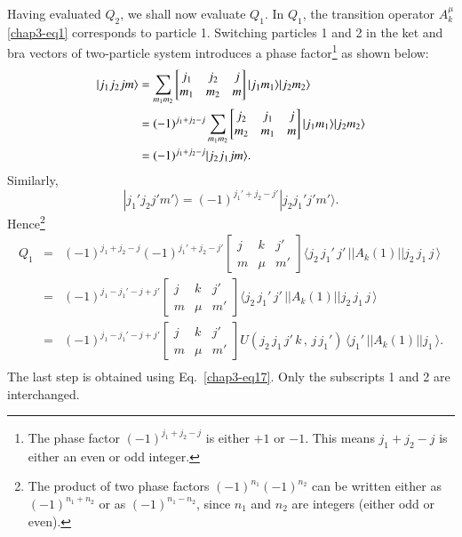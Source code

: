 Having evaluated $Q_2$, we shall now evaluate $Q_1$. In $Q_1$, the transition operator $A_k^\mu$ \eqref{chap3-eq1} corresponds to particle 1. Switching particles 1 and 2 in the ket and bra vectors of two-particle system introduces a phase factor\footnote{The phase factor $(-1)^{j_1 +j_2-j}$ is either $+1$ or $-1$. This means $j_1 + j_2-j$ is either an even or odd integer.}  as shown below:
\begin{align}
| j_1 j_2 j m\rangle 
& = \sum_{m_1m_2} \begin{bmatrix}j_1 & j_2 & j\\m_1 & m_2 & m\end{bmatrix} |j_1 m_1 \rangle| j_2 m_2\rangle \notag \\
& = (-1)^{j_1+j_2-j} \sum_{m_1 m_2} 
	\begin{bmatrix}j_2 & j_1 & j\\m_2 & m_1 & m \end{bmatrix} |j_1 m_1 \rangle | j_2 m_2 \rangle \notag \\
& = (-1)^{j_1 + j_2-j} | j_2 j_1 j m \rangle .\label{chap3-eq19}
\end{align}
Similarly,
\begin{equation}
|j_1' j_2 j' m' \rangle = (-1)^{j_1' + j_2 - j'} | j_2 j_1' j' m' \rangle . \label{chap3-eq20}
\end{equation}
Hence\footnote{The product of two phase factors $(-1)^{n_1} (-1)^{n_2}$ can be written either as $(-1)^{n_1 + n_2}$ or as $(-1)^{n_1-n_2}$, since $n_1$ and $n_2$ are integers (either odd or even).}
\begin{eqnarray}
	Q_1 &=& (-1)^{j_1+j_2-j}(-1)^{j_1'+j_2-j'}
\left[ \begin{array}{ccc}
		j & k & j'\\
		m & \mu & m'  \end{array} \right] 
\langle j_2\, j_1'\, j'\, || A_k(1) || j_2\, j_1\,j\,\rangle\nonumber \\
	&=& (-1)^{j_1-j_1'-j+j'}
	\left[ \begin{array}{ccc}
		j & k & j'\\
		m & \mu & m'  \end{array} \right] 
	\langle j_2\, j_1'\, j'\, || A_k(1) || j_2\, j_1\,j\,\rangle \nonumber \\
	&=& (-1)^{j_1-j_1'-j+j'}
	\left[ \begin{array}{ccc}
		j & k & j'\\
		m & \mu & m'  \end{array} \right] U(j_2\,j_1\,j'\, k\,,\,j\,j_1')\,
	\langle j_1'\, || A_k(1) ||  j_1\,\rangle.
\nonumber \\
	\label{chap3-eq21}
\end{eqnarray}
The last step is obtained using Eq.\ \eqref{chap3-eq17}. Only the subscripts 1 and 2 are interchanged. 


